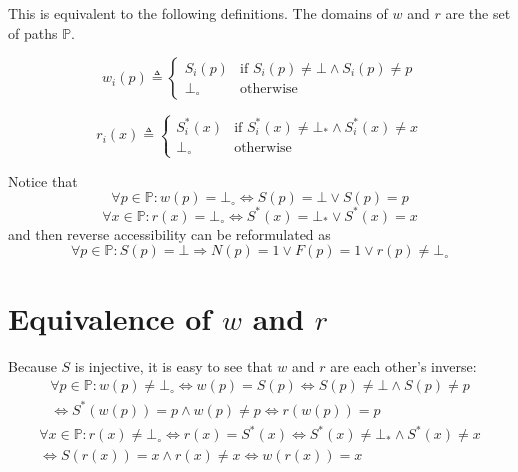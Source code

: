\documentclass[12pt]{article}
\newcommand{\bdt}{\bot\!_*}
\newcommand{\varn}{\bot\!_\circ}
\newcommand{\setp}{\mathbb{P}}
\begin{document}
This is equivalent to the following definitions. The domains of $w$ and $r$
are the set of paths $\setp$.

\begin{equation}
w_i(p)\triangleq\left\{ \begin{array}{ll}
S_i(p) & \mbox{if }S_i(p)\neq\bot \wedge S_i(p)\neq p\\
\varn & \mbox{otherwise}
\end{array}\right.
\end{equation}

\begin{equation}
r_i(x)\triangleq\left\{ \begin{array}{ll}
S^*_i(x) & \mbox{if }S^*_i(x)\neq\bdt \wedge S^*_i(x)\neq x \\
\varn & \mbox{otherwise}
\end{array}\right.
\end{equation}

Notice that
\begin{equation} \forall p\in\setp: w(p)=\varn \Leftrightarrow S(p)=\bot \vee S(p)=p \end{equation}
\begin{equation} \forall x\in\setp: r(x)=\varn \Leftrightarrow S^*(x)=\bdt \vee S^*(x)=x \end{equation}
and then reverse accessibility can be reformulated as
\begin{equation} \forall p\in\setp: S(p)=\bot \Rightarrow N(p)=1 \vee F(p)=1 \vee r(p)\neq\varn \end{equation}

\section{Equivalence of $w$ and $r$}

Because $S$ is injective, it is easy to see that $w$ and $r$ are each other's inverse:
\begin{multline}
\forall p\in\setp:
w(p)\neq\varn \Leftrightarrow w(p)=S(p) \Leftrightarrow S(p)\neq\bot \wedge S(p)\neq p \\
\Leftrightarrow S^*(w(p))=p \wedge w(p)\neq p \Leftrightarrow r(w(p)) = p
\end{multline}
\begin{multline}
\forall x\in\setp:
r(x)\neq\varn \Leftrightarrow r(x)=S^*(x) \Leftrightarrow S^*(x)\neq\bdt \wedge S^*(x)\neq x \\
\Leftrightarrow S(r(x))=x \wedge r(x)\neq x \Leftrightarrow w(r(x)) = x
\end{multline}
\end{document}
